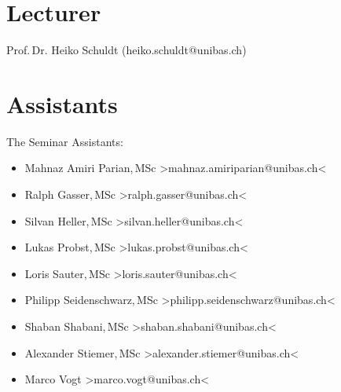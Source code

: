 \documentclass[runningheads,a4paper]{llncs}
\newenvironment{produceProceedings}{}{}
\begin{document}
\begin{produceProceedings}
	\section*{Lecturer}
	Prof.\,Dr. Heiko Schuldt (heiko.schuldt@unibas.ch)
	\section*{Assistants}
	The Seminar Assistants:\\
    
    \begin{itemize}
        \item[] Mahnaz Amiri Parian,\,MSc \textgreater mahnaz.amiriparian@unibas.ch\textless
        \item[] Ralph Gasser,\,MSc \textgreater ralph.gasser@unibas.ch\textless
        \item[] Silvan Heller,\,MSc \textgreater silvan.heller@unibas.ch\textless
        \item[] Lukas Probst,\,MSc \textgreater lukas.probst@unibas.ch\textless
        \item[] Loris Sauter,\,MSc \textgreater loris.sauter@unibas.ch\textless
        \item[] Philipp Seidenschwarz,\,MSc \textgreater philipp.seidenschwarz@unibas.ch\textless
        \item[] Shaban Shabani,\,MSc \textgreater shaban.shabani@unibas.ch\textless
        \item[] Alexander Stiemer,\,MSc \textgreater alexander.stiemer@unibas.ch\textless
        \item[] Marco Vogt \textgreater marco.vogt@unibas.ch\textless
    \end{itemize}
	\tableofcontents
\end{produceProceedings}
	
%
\mainmatter
%


\end{document}
